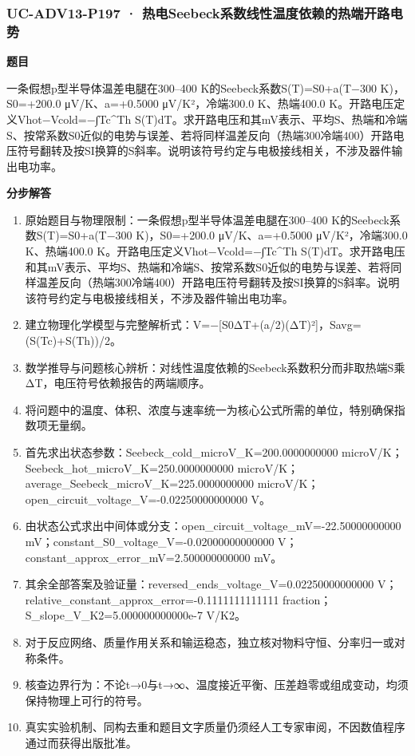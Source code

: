 \documentclass[UTF8,11pt,a4paper]{ctexart}
\begin{document}
\subsubsection*{UC-ADV13-P197 · 热电Seebeck系数线性温度依赖的热端开路电势}
\noindent\textbf{题目}\par
一条假想p型半导体温差电腿在300–400 K的Seebeck系数S(T)=S0+a(T−300 K)，S0=+200.0 μV/K、a=+0.5000 μV/K²，冷端300.0 K、热端400.0 K。开路电压定义Vhot−Vcold=−∫Tc\textasciicircum{}Th S(T)dT。求开路电压和其mV表示、平均S、热端和冷端S、按常系数S0近似的电势与误差、若将同样温差反向（热端300冷端400）开路电压符号翻转及按SI换算的S斜率。说明该符号约定与电极接线相关，不涉及器件输出电功率。\par
\medskip\noindent\textbf{分步解答}
\begin{enumerate}
\item 原始题目与物理限制：一条假想p型半导体温差电腿在300–400 K的Seebeck系数S(T)=S0+a(T−300 K)，S0=+200.0 μV/K、a=+0.5000 μV/K²，冷端300.0 K、热端400.0 K。开路电压定义Vhot−Vcold=−∫Tc\textasciicircum{}Th S(T)dT。求开路电压和其mV表示、平均S、热端和冷端S、按常系数S0近似的电势与误差、若将同样温差反向（热端300冷端400）开路电压符号翻转及按SI换算的S斜率。说明该符号约定与电极接线相关，不涉及器件输出电功率。
\item 建立物理化学模型与完整解析式：V=−[S0ΔT+(a/2)(ΔT)²]，Savg=(S(Tc)+S(Th))/2。
\item 数学推导与问题核心辨析：对线性温度依赖的Seebeck系数积分而非取热端S乘ΔT，电压符号依赖报告的两端顺序。
\item 将问题中的温度、体积、浓度与速率统一为核心公式所需的单位，特别确保指数项无量纲。
\item 首先求出状态参数：Seebeck\_cold\_microV\_K=200.0000000000 microV/K；Seebeck\_hot\_microV\_K=250.0000000000 microV/K；average\_Seebeck\_microV\_K=225.0000000000 microV/K；open\_circuit\_voltage\_V=-0.02250000000000 V。
\item 由状态公式求出中间体或分支：open\_circuit\_voltage\_mV=-22.50000000000 mV；constant\_S0\_voltage\_V=-0.02000000000000 V；constant\_approx\_error\_mV=2.500000000000 mV。
\item 其余全部答案及验证量：reversed\_ends\_voltage\_V=0.02250000000000 V；relative\_constant\_approx\_error=-0.1111111111111 fraction；S\_slope\_V\_K2=5.000000000000e-7 V/K2。
\item 对于反应网络、质量作用关系和输运稳态，独立核对物料守恒、分率归一或对称条件。
\item 核查边界行为：不论t→0与t→∞、温度接近平衡、压差趋零或组成变动，均须保持物理上可行的符号。
\item 真实实验机制、同构去重和题目文字质量仍须经人工专家审阅，不因数值程序通过而获得出版批准。
\end{enumerate}
\end{document}
